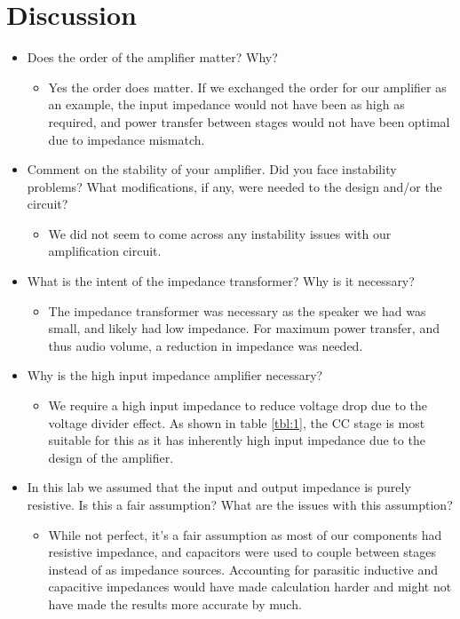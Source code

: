 \documentclass[12pt]{article}
\begin{document}
\section{Discussion}
\begin{itemize}
    \item Does the order of the amplifier matter? Why?
    \begin{itemize}
        \item Yes the order does matter. If we exchanged the order for our amplifier as an example, the input impedance would not have been as high as required, and power transfer between stages would not have been optimal due to impedance mismatch.
    \end{itemize}
    \item Comment on the stability of your amplifier. Did you face instability problems? What modifications, if any, were needed to the design and/or the circuit?
    \begin{itemize}
        \item We did not seem to come across any instability issues with our amplification circuit.
    \end{itemize}
    \item What is the intent of the impedance transformer? Why is it necessary?
    \begin{itemize}
        \item The impedance transformer was necessary as the speaker we had was small, and likely had low impedance. For maximum power transfer, and thus audio volume, a reduction in impedance was needed.
    \end{itemize}
    \item Why is the high input impedance amplifier necessary?
    \begin{itemize}
        \item We require a high input impedance to reduce voltage drop due to the voltage divider effect. As shown in table \ref{tbl:1}, the CC stage is most suitable for this as it has inherently high input impedance due to the design of the amplifier.
    \end{itemize}
    \item In this lab we assumed that the input and output impedance is purely resistive. Is this a fair assumption? What are the issues with this assumption?
    \begin{itemize}
        \item While not perfect, it's a fair assumption as most of our components had resistive impedance, and capacitors were used to couple between stages instead of as impedance sources. Accounting for parasitic inductive and capacitive impedances would have made calculation harder and might not have made the results more accurate by much.

\end{itemize}
\end{itemize}
\end{document}
